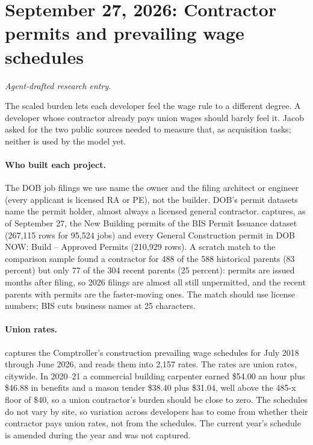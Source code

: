 \clearpage
\section*{September 27, 2026: Contractor permits and prevailing wage schedules}
\textit{Agent-drafted research entry.}

The scaled burden lets each developer feel the wage rule to a different
degree. A developer whose contractor already pays union wages should barely
feel it. Jacob asked for the two public sources needed to measure that, as
acquisition tasks; neither is used by the model yet.

\paragraph{Who built each project.} The DOB job filings we use name the owner
and the filing architect or engineer (every applicant is licensed RA or PE),
not the builder. DOB's permit datasets name the permit holder, almost always a
licensed general contractor.  captures, as of
September 27, the New Building permits of the BIS Permit Issuance dataset
(267,115 rows for 95,524 jobs) and every General Construction permit in DOB
NOW: Build -- Approved Permits (210,929 rows). A scratch match to the comparison
sample found a contractor for 488 of the 588 historical parents (83 percent)
but only 77 of the 304 recent parents (25 percent): permits are issued months
after filing, so 2026 filings are almost all still unpermitted, and the
recent parents with permits are the faster-moving ones. The match should use
license numbers; BIS cuts business names at 25 characters.

\paragraph{Union rates.}  captures
the Comptroller's construction prevailing wage schedules for July 2018 through
June 2026, and  reads them into
2,157 rates. The rates are union rates, citywide. In 2020--21 a commercial
building carpenter earned \$54.00 an hour plus \$46.88 in benefits and a mason
tender \$38.40 plus \$31.04, well above the 485-x floor of \$40, so a union
contractor's burden should be close to zero. The schedules do not vary by site,
so variation across developers has to come from whether their contractor pays
union rates, not from the schedules. The current year's schedule is amended
during the year and was not captured.

